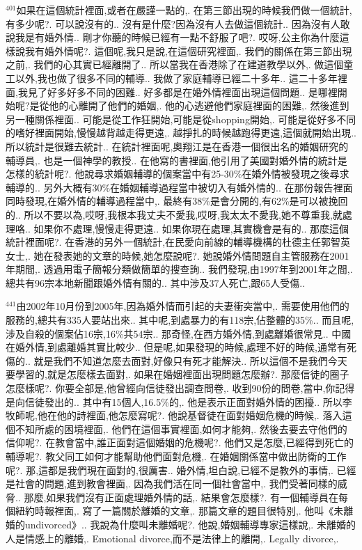 \documentclass{book}
\begin{document}
$^{401}$如果在這個統計裡面,或者在嚴謹一點的,.
在第三節出現的時候我們做一個統計,有多少呢?.
可以說沒有的..
沒有是什麼?因為沒有人去做這個統計..
因為沒有人敢說我是有婚外情..
剛才你聽的時候已經有一點不舒服了吧?.
哎呀,公主你為什麼這樣說我有婚外情呢?.
這個呢,我只是說,在這個研究裡面,.
我們的關係在第三節出現之前,.
我們的心其實已經離開了..
所以當我在香港除了在建道教學以外,.
做這個童工以外,我也做了很多不同的輔導..
我做了家庭輔導已經二十多年..
這二十多年裡面,我見了好多好多不同的困難..
好多都是在婚外情裡面出現這個問題..
是哪裡開始呢?是從他的心離開了他們的婚姻,.
他的心逃避他們家庭裡面的困難,.
然後進到另一種關係裡面..
可能是從工作狂開始,可能是從shopping開始,.
可能是從好多不同的嗜好裡面開始,慢慢越背越走得更遠,.
越掙扎的時候越跑得更遠,這個就開始出現..
所以統計是很難去統計..
在統計裡面呢,奧翔江是在香港一個很出名的婚姻研究的輔導員,.
也是一個神學的教授..
在他寫的書裡面,他引用了美國對婚外情的統計是怎樣的統計呢?.
他說尋求婚姻輔導的個案當中有25-30\%在婚外情被發現之後尋求輔導的..
另外大概有30\%在婚姻輔導過程當中被切入有婚外情的..
在那份報告裡面同時發現,在婚外情的輔導過程當中,.
最終有38\%是會分開的,有62\%是可以被挽回的..
所以不要以為,哎呀,我根本我丈夫不愛我,哎呀,我太太不愛我,她不尊重我,就處理咯..
如果你不處理,慢慢走得更遠..
如果你現在處理,其實機會是有的..
那麼這個統計裡面呢?.
在香港的另外一個統計,在民愛向前線的輔導機構的杜德主任郭智英女士,.
她在發表她的文章的時候,她怎麼說呢?.
她說婚外情問題自主管服務在2001年期間,.
透過用電子簡報分類做簡單的搜查詢..
我們發現,由1997年到2001年之間,.
總共有96宗本地新聞跟婚外情有關的..
其中涉及37人死亡,跟65人受傷..

$^{441}$由2002年10月份到2005年,因為婚外情而引起的夫妻衝突當中,.
需要使用他們的服務的,總共有335人要站出來..
其中呢,到處暴力的有118宗,佔整體的35\%..
而且呢,涉及自殺的個案佔16宗,16\%共54宗..
那奇怪,在西方婚外情,到處離婚很常見..
中國在婚外情,到處離婚其實比較少..
但是呢,如果發現的時候,處理不好的時候,通常有死傷的..
就是我們不知道怎麼去面對,好像只有死才能解決..
所以這個不是我們今天要學習的,就是怎麼樣去面對,.
如果在婚姻裡面出現問題怎麼辦?.
那麼信徒的圈子怎麼樣呢?.
你要全部是,他曾經向信徒發出調查問卷,.
收到90份的問卷,當中,你記得是向信徒發出的..
其中有15個人,16.5\%的,.
他是表示正面對婚外情的困擾..
所以李牧師呢,他在他的詩裡面,他怎麼寫呢?.
他說基督徒在面對婚姻危機的時候,.
落入這個不知所處的困境裡面,.
他們在這個事實裡面,如何才能夠,.
然後去要去守他們的信仰呢?.
在教會當中,誰正面對這個婚姻的危機呢?.
他們又是怎麼,已經得到死亡的輔導呢?.
教父同工如何才能幫助他們面對危機,.
在婚姻關係當中做出防衛的工作呢?.
那,這都是我們現在面對的,很厲害..
婚外情,坦白說,已經不是教外的事情,.
已經是社會的問題,進到教會裡面,.
因為我們活在同一個社會當中,.
我們受著同樣的威脅..
那麼,如果我們沒有正面處理婚外情的話,.
結果會怎麼樣?.
有一個輔導員在每個紐約時報裡面,.
寫了一篇關於離婚的文章,.
那篇文章的題目很特別,.
他叫《未離婚的undivorced》..
我說為什麼叫未離婚呢?.
他說,婚姻輔導專家這樣說,.
未離婚的人是情感上的離婚,.
Emotional divorce,而不是法律上的離開,.
Legally divorce,.
\end{document}
